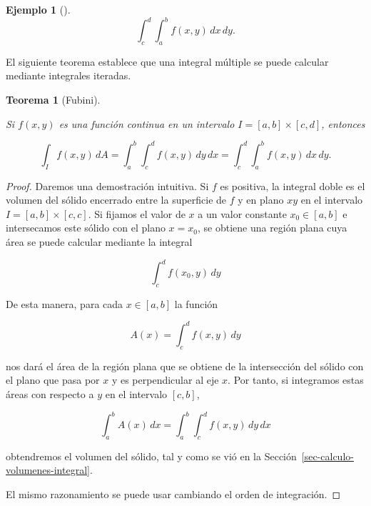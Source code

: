 \documentclass[
  a4paper,
]{scrreport}
\theoremstyle{definition}
\newtheorem{example}{Ejemplo}[chapter]
\theoremstyle{plain}
\theoremstyle{definition}
\theoremstyle{definition}
\theoremstyle{plain}
\newtheorem{theorem}{Teorema}[chapter]
\theoremstyle{plain}
\theoremstyle{remark}
\begin{document}
\begin{example}[]
\[
\int_c^d\int_a^b f(x,y)\,dx\,dy.
\]

El siguiente teorema establece que una integral múltiple se puede
calcular mediante integrales iteradas.

\begin{theorem}[Fubini]\protect\hypertarget{thm-teorema-fubini}{}\label{thm-teorema-fubini}

Si \(f(x,y)\) es una función continua en un intervalo
\(I=[a,b]\times [c,d]\), entonces

\[
\int_I f(x,y)\, dA 
= \int_a^b\int_c^d f(x,y)\,dy\,dx 
= \int_c^d\int_a^b f(x,y)\,dx\,dy.
\]

\end{theorem}

\begin{tcolorbox}[enhanced jigsaw, leftrule=.75mm, colbacktitle=quarto-callout-note-color!10!white, toprule=.15mm, opacityback=0, opacitybacktitle=0.6, toptitle=1mm, breakable, bottomtitle=1mm, colframe=quarto-callout-note-color-frame, rightrule=.15mm, titlerule=0mm, title=\textcolor{quarto-callout-note-color}{\faInfo}\hspace{0.5em}{Demostración}, arc=.35mm, left=2mm, bottomrule=.15mm, colback=white, coltitle=black]

\begin{proof}
Daremos una demostración intuitiva. Si \(f\) es positiva, la integral
doble es el volumen del sólido encerrado entre la superficie de \(f\) y
en plano \(xy\) en el intervalo \(I=[a,b]\times [c,c]\). Si fijamos el
valor de \(x\) a un valor constante \(x_0\in[a,b]\) e intersecamos este
sólido con el plano \(x=x_0\), se obtiene una región plana cuya área se
puede calcular mediante la integral

\[
\int_c^d f(x_0,y)\,dy
\]

De esta manera, para cada \(x\in[a,b]\) la función

\[
A(x) = \int_c^d f(x,y)\,dy
\]

nos dará el área de la región plana que se obtiene de la intersección
del sólido con el plano que pasa por \(x\) y es perpendicular al eje
\(x\). Por tanto, si integramos estas áreas con respecto a \(y\) en el
intervalo \([c,b]\),

\[
\int_a^b A(x)\,dx = \int_a^b\int_c^d f(x,y)\,dy\,dx
\]

obtendremos el volumen del sólido, tal y como se vió en la
Sección~\ref{sec-calculo-volumenes-integral}.

El mismo razonamiento se puede usar cambiando el orden de integración.
\end{proof}


\end{tcolorbox}
\end{example}
\end{document}
